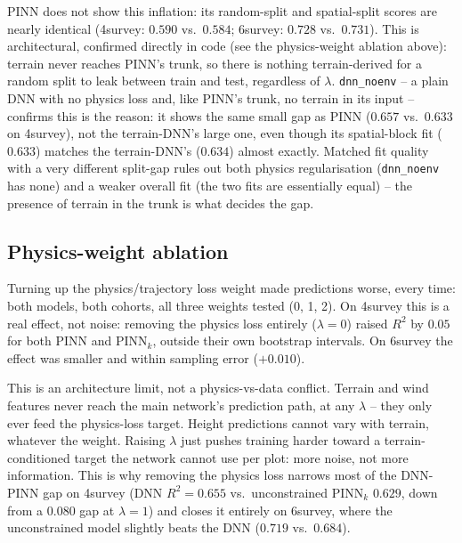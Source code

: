 PINN does not show this inflation: its random-split and spatial-split scores are nearly identical
(4survey: $0.590$ vs.\ $0.584$; 6survey: $0.728$ vs.\ $0.731$). This is architectural, confirmed
directly in code (see the physics-weight ablation above): terrain never reaches PINN's trunk, so
there is nothing terrain-derived for a random split to leak between train and test, regardless of
$\lambda$. \texttt{dnn\_noenv} -- a plain DNN with no physics loss and, like PINN's trunk, no
terrain in its input -- confirms this is the reason: it shows the same small gap as PINN ($0.657$
vs.\ $0.633$ on 4survey), not the terrain-DNN's large one, even though its spatial-block fit
($0.633$) matches the terrain-DNN's ($0.634$) almost exactly. Matched fit quality with a very
different split-gap rules out both physics regularisation (\texttt{dnn\_noenv} has none) and a
weaker overall fit (the two fits are essentially equal) -- the presence of terrain in the trunk is
what decides the gap.


\subsection{Physics-weight ablation}

Turning up the physics/trajectory loss weight made predictions worse, every time: both models,
both cohorts, all three weights tested (0, 1, 2). On 4survey this is a real effect, not noise:
removing the physics loss entirely ($\lambda=0$) raised $R^2$ by $0.05$ for both PINN and
PINN$_k$, outside their own bootstrap intervals. On 6survey the effect was smaller and within
sampling error ($+0.010$).

This is an architecture limit, not a physics-vs-data conflict. Terrain and wind features never
reach the main network's prediction path, at any $\lambda$ -- they only ever feed the physics-loss
target. Height predictions cannot vary with terrain, whatever the weight. Raising $\lambda$ just
pushes training harder toward a terrain-conditioned target the network cannot use per plot: more
noise, not more information. This is why removing the physics loss narrows most of the DNN-PINN
gap on 4survey (DNN $R^2=0.655$ vs.\ unconstrained PINN$_k$ $0.629$, down from a $0.080$ gap at
$\lambda=1$) and closes it entirely on 6survey, where the unconstrained model slightly beats the
DNN ($0.719$ vs.\ $0.684$).


